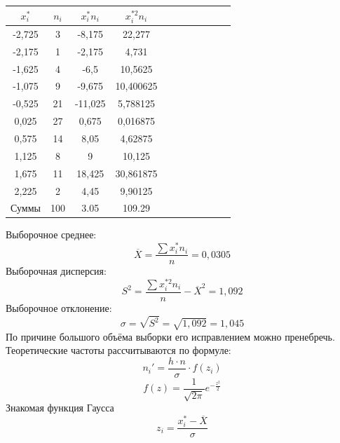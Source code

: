 \documentclass{article}
\begin{document}
\begin{center}
    \begin{table}[h]
        \centering
        \begin{tabular}{|*{11}{c|}}
            \hline
            $x_i^*$& $n_i$ &$x_i^*n_i$ &$x_i^{*2}n_i$\\
            \hline
            -2,725&	3	&-8,175	&22,277\\
            \hline
            -2,175&	1&	-2,175&	4,731\\
            \hline
            -1,625&	4	&-6,5&	10,5625\\
            \hline
            -1,075 & 9 & -9,675 & 10,400625 \\
            \hline
            -0,525 & 21 & -11,025 & 5,788125 \\
            \hline
            0,025 & 27 & 0,675 & 0,016875 \\
            \hline
            0,575 & 14 & 8,05 & 4,62875 \\
            \hline
            1,125 & 8 & 9 & 10,125 \\
            \hline
            1,675 & 11 & 18,425 & 30,861875 \\
            \hline
            2,225 & 2 & 4,45 & 9,90125\\
            \hline
            Суммы &100& 3.05& 109.29\\
            \hline
        \end{tabular}
    \end{table}
\end{center}
Выборочное среднее: 
\[\overline{X} = \frac{\sum x_i^*n_i}{n} = 0,0305\]
Выборочная дисперсия:
\[S^2 = \frac{\sum x_i^{*2}n_i}{n} - \overline{X}^2 = 1,092\]
Выборочное отклонение:
\[\sigma = \sqrt{S^2} = \sqrt{1,092} = 1,045\]
По причине большого объёма выборки его исправлением можно пренебречь.
Теоретические частоты рассчитываются по формуле:
\[n_i' = \frac{h\cdot n}{\sigma}\cdot f(z_i)\]
\[f(z) = \frac{1}{\sqrt{2\pi}}e^{-\frac{z^2}{2}}\]
Знакомая функция Гаусса 
\[z_i = \frac{x_i^* - \overline{X}}{\sigma}\]
\end{document}
